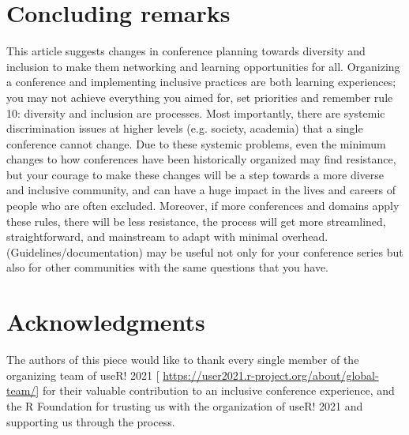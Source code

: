 \documentclass[10pt,letterpaper]{article}
\begin{document}
\section*{Concluding remarks}

This article suggests changes in conference planning towards diversity and inclusion to make them networking and learning opportunities for all. 
Organizing a conference and implementing inclusive practices are both learning experiences;
you may not achieve everything you aimed for, set priorities and remember rule 10: diversity and inclusion are processes. 
Most importantly, there are systemic discrimination issues at higher levels (e.g. society, academia) that a single conference cannot change. 
Due to these systemic problems, even the minimum changes to how conferences have been historically organized may find resistance, but your courage to make these changes will be a step towards a more diverse and inclusive community, and can have a huge impact in the lives and careers of people who are often excluded.
Moreover, if more conferences and domains apply these rules, there will be less resistance, the process will get more streamlined, straightforward, and mainstream to adapt with minimal overhead.
(Guidelines/documentation) may be useful not only for your conference series but also for other communities with the same questions that you have. %

\section*{Acknowledgments}
The authors of this piece would like to thank every single member of the organizing team of useR! 2021 [ \url{https://user2021.r-project.org/about/global-team/}] for their valuable contribution to an inclusive conference experience, and the R Foundation for trusting us with the organization of useR! 2021 and supporting us through the process. 




\end{document}
